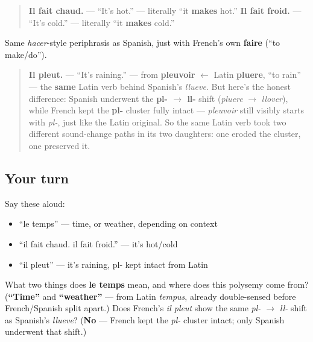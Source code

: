 \begin{grammarlens}[title={Grammar Lens: il fait chaud / il fait froid}]
\begin{quote}
\textbf{Il fait chaud.} — \textquotedblleft{}It's hot.\textquotedblright{} — literally \textquotedblleft{}it \textbf{makes} hot.\textquotedblright{} \textbf{Il fait froid.} — \textquotedblleft{}It's cold.\textquotedblright{} — literally \textquotedblleft{}it \textbf{makes} cold.\textquotedblright{}
\end{quote}

Same \emph{hacer}-style periphrasis as Spanish, just with French's own \textbf{faire} (\textquotedblleft{}to make/do\textquotedblright{}).
\end{grammarlens}

\begin{cousinweb}
\begin{quote}
\textbf{Il pleut.} — \textquotedblleft{}It's raining.\textquotedblright{} — from \textbf{pleuvoir} $\leftarrow$ Latin \textbf{pluere}, \textquotedblleft{}to rain\textquotedblright{} — the \textbf{same} Latin verb behind Spanish's \emph{llueve}. But here's the honest difference: Spanish underwent the \textbf{pl- $\to$ ll-} shift (\emph{pluere} $\to$ \emph{llover}), while French kept the \textbf{pl-} cluster fully intact — \emph{pleuvoir} still visibly starts with \emph{pl-}, just like the Latin original. So the same Latin verb took two different sound-change paths in its two daughters: one eroded the cluster, one preserved it.
\end{quote}
\end{cousinweb}

\subsection*{Your turn}
Say these aloud:

\begin{itemize}
\raggedright
  \item \textquotedblleft{}le temps\textquotedblright{} — time, or weather, depending on context
  \item \textquotedblleft{}il fait chaud. il fait froid.\textquotedblright{} — it's hot/cold
  \item \textquotedblleft{}il pleut\textquotedblright{} — it's raining, pl- kept intact from Latin
\end{itemize}

\begin{tcolorbox}[breakable,colback=teal!4,colframe=teal!35!black,title={Before you move on}]
What two things does \textbf{le temps} mean, and where does this polysemy come from? (\textbf{\textquotedblleft{}Time\textquotedblright{}} and \textbf{\textquotedblleft{}weather\textquotedblright{}} — from Latin \emph{tempus}, already double-sensed before French/Spanish split apart.) Does French's \emph{il pleut} show the same \emph{pl- $\to$ ll-} shift as Spanish's \emph{llueve}? (\textbf{No} — French kept the \emph{pl-} cluster intact; only Spanish underwent that shift.)
\end{tcolorbox}
